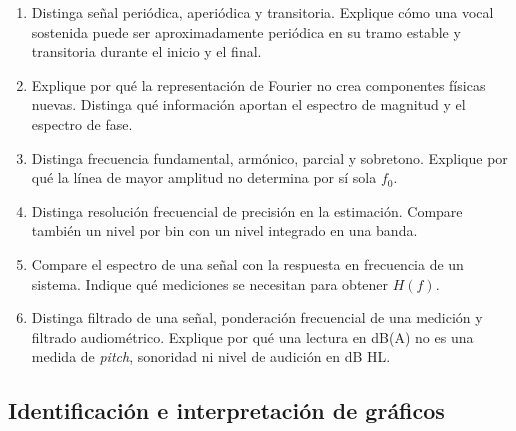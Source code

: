 \begin{enumerate}[label=\textbf{C\arabic*.},leftmargin=*]
    \item Distinga señal periódica, aperiódica y transitoria. Explique cómo una
    vocal sostenida puede ser aproximadamente periódica en su tramo estable y
    transitoria durante el inicio y el final.

    \item Explique por qué la representación de Fourier no crea componentes
    físicas nuevas. Distinga qué información aportan el espectro de magnitud y
    el espectro de fase.

    \item Distinga frecuencia fundamental, armónico, parcial y sobretono.
    Explique por qué la línea de mayor amplitud no determina por sí sola
    \(f_0\).

    \item Distinga resolución frecuencial de precisión en la estimación.
    Compare también un nivel por bin con un nivel integrado en una banda.

    \item Compare el espectro de una señal con la respuesta en frecuencia de
    un sistema. Indique qué mediciones se necesitan para obtener
    \(H(f)\).

    \item Distinga filtrado de una señal, ponderación frecuencial de una
    medición y filtrado audiométrico. Explique por qué una lectura en dB(A) no
    es una medida de \emph{pitch}, sonoridad ni nivel de audición en dB HL.
\end{enumerate}

\subsection*{Identificación e interpretación de gráficos}

